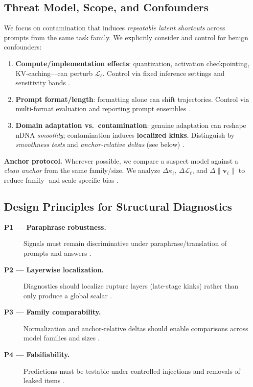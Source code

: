 \documentclass[11pt]{article}
\begin{document}
\subsection{Threat Model, Scope, and Confounders}
We focus on contamination that induces \emph{repeatable latent shortcuts} across prompts from the same task family. We explicitly consider and control for benign confounders:
\begin{enumerate}
    \item \textbf{Compute/implementation effects}: quantization, activation checkpointing, KV-caching—can perturb $\mathcal{L}_\ell$. Control via fixed inference settings and sensitivity bands \citep{dettmers2023llmint8,frantar2022gptq}.
    \item \textbf{Prompt format/length}: formatting alone can shift trajectories. Control via multi-format evaluation and reporting prompt ensembles \citep{zhao2021calibrate,lu2022fantastically}.
    \item \textbf{Domain adaptation vs.\ contamination}: genuine adaptation can reshape nDNA \emph{smoothly}; contamination induces \textbf{localized kinks}. Distinguish by \emph{smoothness tests} and \emph{anchor-relative deltas} (see below) \citep{raghu2017svcca,kornblith2019cka}.
\end{enumerate}
\textbf{Anchor protocol.} Wherever possible, we compare a suspect model against a \emph{clean anchor} from the same family/size. We analyze $\Delta\kappa_\ell$, $\Delta\mathcal{L}_\ell$, and $\Delta\|\mathbf{v}_\ell\|$ to reduce family- and scale-specific bias \citep{kornblith2019cka}.

\subsection{Design Principles for Structural Diagnostics}
\begin{description}
    \item[\textbf{P1 — Paraphrase robustness.}] Signals must remain discriminative under paraphrase/translation of prompts and answers \citep{ribeiro2020checklist,iyyer2018scpn}.
    \item[\textbf{P2 — Layerwise localization.}] Diagnostics should localize rupture layers (late-stage kinks) rather than only produce a global scalar \citep{raghu2017svcca,ansuini2019intrinsic}.
    \item[\textbf{P3 — Family comparability.}] Normalization and anchor-relative deltas should enable comparisons across model families and sizes \citep{kornblith2019cka}.
    \item[\textbf{P4 — Falsifiability.}] Predictions must be testable under controlled injections and removals of leaked items \citep{deng2024investigating,li2024opencontam}.
\end{description}
\end{document}
